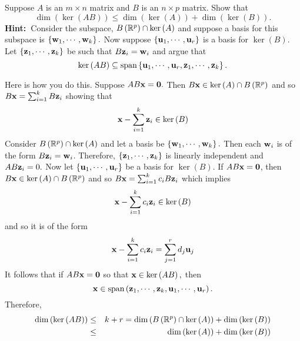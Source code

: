 \begin{enumialphparenastyle}
\begin{ex} Suppose $A$ is an $m\times n$ matrix and $B$ is an $n\times p$ matrix.
Show that 
\begin{equation*}
\dim \left( \ker \left( AB\right) \right) \leq \dim \left( \ker \left(
A\right) \right) +\dim \left( \ker \left( B\right) \right) .
\end{equation*}
\textbf{Hint:\ }Consider the subspace, $B\left( \mathbb{R}^{p}\right) \cap
\ker \left( A\right) $ and suppose a basis for this subspace is $\left\{ 
{\bf w}_{1},\cdots ,{\bf w}_{k}\right\} .$ Now suppose $\left\{ 
{\bf u}_{1},\cdots ,{\bf u}_{r}\right\} $ is a basis for $\ker \left(
B\right) .$ Let $\left\{ {\bf z}_{1},\cdots ,{\bf z}_{k}\right\} $ be
such that $B{\bf z}_{i}={\bf w}_{i}$ and argue that 
\begin{equation*}
\ker \left( AB\right) \subseteq \mbox{span}\left\{ {\bf u}_{1},\cdots ,
{\bf u}_{r},{\bf z}_{1},\cdots ,{\bf z}_{k}\right\} .
\end{equation*}
\vspace{1mm}
\begin{sol}
Here is how you do this. Suppose $AB{\bf x}={\bf 0}.$ Then $B{\bf x}\in \ker
\left( A\right) \cap B\left( \mathbb{R}^{p}\right) $ and so $B{\bf x}
=\sum_{i=1}^{k}B{\bf z}_{i}$ showing that
\[
{\bf x}-\sum_{i=1}^{k}{\bf z}_{i}\in \ker \left( B\right) 
\]
Consider $B\left( \mathbb{R}^{p}\right) \cap \ker \left( A\right) $ and let
a basis be $\left\{ {\bf w}_{1},\cdots ,{\bf w}_{k}\right\} .$ Then
each ${\bf w}_{i}$ is of the form $B{\bf z}_{i}={\bf w}_{i}$.
Therefore, $\left\{ {\bf z}_{1},\cdots ,{\bf z}_{k}\right\} $ is
linearly independent and $AB{\bf z}_{i}=0.$ Now let $\left\{ {\bf u}
_{1},\cdots ,{\bf u}_{r}\right\} $ be a basis for $\ker \left( B\right) .$
If $AB{\bf x}={\bf 0}$, then $B{\bf x} \in \ker \left( A\right) \cap B\left(
\mathbb{R}^{p}\right) $ and so $B{\bf x}=\sum_{i=1}^{k}c_{i}B{\bf z}
_{i}$ which implies
\[
{\bf x}-\sum_{i=1}^{k}c_{i}{\bf z}_{i}\in \ker \left( B\right)
\]
and so it is of the form
\[
{\bf x}-\sum_{i=1}^{k}c_{i}{\bf z}_{i}=\sum_{j=1}^{r}d_{j}{\bf u}
_{j}
\]
It follows that if $AB{\bf x}={\bf 0}$ so that ${\bf x}\in \ker \left(
AB\right) ,$ then
\[
{\bf x}\in \mbox{span}\left( {\bf z}_{1},\cdots ,{\bf z}_{k},
{\bf u}_{1},\cdots ,{\bf u}_{r}\right) .
\]
Therefore,
\begin{eqnarray*}
\dim \left( \ker \left( AB\right) \right)  &\leq &k+r=\dim \left( B\left(
\mathbb{R}^{p}\right) \cap \ker \left( A\right) \right) +\dim \left( \ker
\left( B\right) \right)  \\
&\leq &\dim \left( \ker \left( A\right) \right) +\dim \left( \ker \left(
B\right) \right)
\end{eqnarray*}
\end{sol}
\end{ex}



\end{enumialphparenastyle}
